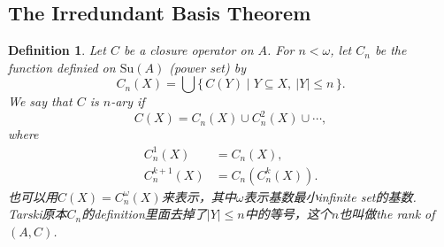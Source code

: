 \documentclass{article}
\newtheorem{definition}[theorem]{Definition}
\newcommand\Set[2]{\{\,#1\mid#2\,\}} %
\begin{document}
\newpage
\subsection{The Irredundant Basis Theorem}

\begin{definition}
\rm Let $C$ be a closure operator on $A$. For $n < \omega$, let $C_n$ be the function definied on $\text{Su}(A)$ (power set) by 
$$
C_n(X) = \bigcup\Set{C(Y)}{Y \subseteq X,\ |Y| \leq n}.
$$
We say that $C$ is $n$-ary if 
$$
C(X) = C_n (X) \cup C_n^2(X) \cup \cdots,
$$
where 
$$
\begin{aligned}
C_n^1(X) &= C_n(X), \\
C_n^{k+1}(X) &= C_n(C_n^k(X)).
\end{aligned}
$$
也可以用$C(X) = C_n^{\omega}(X)$来表示，其中$\omega$表示基数最小infinite set的基数. Tarski原本$C_n$的definition里面去掉了$|Y| \leq n$中的等号，这个$n$也叫做the rank of $(A,C)$. 
\end{definition}
\end{document}
